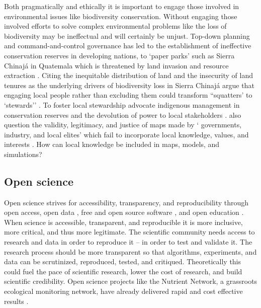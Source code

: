 \documentclass{article}
\begin{document}
Both pragmatically and ethically
it is important to engage those involved in environmental issues like biodiversity conservation. 
%
Without engaging those involved 
efforts to solve complex environmental problems like the loss of biodiversity may be ineffectual and will certainly be unjust.
%
%
Top-down planning and command-and-control governance has led to the establishment 
of ineffective conservation reserves in developing nations, to `paper parks' 
such as Sierra Chinaj\'{a} in Quatemala which is threatened by land invasion and resource extraction 
\citep{Bonham2008}. 
%
Citing the inequitable distribution of land and the insecurity of land tenures 
as the underlying drivers of biodiversity loss in Sierra Chinaj\'{a}
\citeauthor{Bonham2008} argue that engaging local people rather than excluding them 
could transform ``squatters' to `stewards'' \citeyearpar{Bonham2008}. 
%
To foster local stewardship 
\citeauthor{Brosius2003} advocate indigenous management in conservation reserves 
and the devolution of power to local stakeholders 
\citeyearpar{Brosius2003}.
%
\citeauthor{Brosius2003} also question the validity, legitimacy, and justice of maps made by 
` governments, industry, and local elites' 
which fail to incorporate local knowledge, values, and interests 
\citeyearpar{Brosius2003}.
%
How can local knowledge be included in maps, models, and simulations? 

\subsection{Open science}
Open science strives for accessibility, transparency, and reproducibility
through open access, open data \citep{Boulton2012}, 
free and open source software \citep{Ince2012,Rocchini2012}, and
open education \citep{Petras2015}. 
When science is accessible, transparent, and reproducible 
it is more inclusive, more critical, and thus more legitimate. 
%
The scientific community needs access to research and data in order to reproduce it -- in order to test and validate it. 
The research process should be more transparent so that 
algorithms, experiments, and data can be scrutinized, reproduced, tested, and critiqued. 
Theoretically this could fuel the pace of scientific research, lower the cost of research, and build scientific credibility. 
Open science projects like the Nutrient Network, a grassroots ecological monitoring network, 
have already delivered rapid and cost effective results \citep{Stokstad2011}. 
\end{document}
